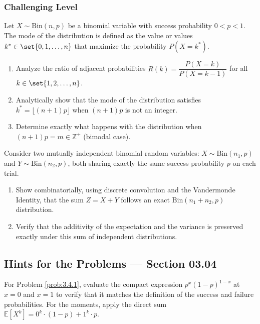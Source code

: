 \subsubsection*{Challenging Level}

\begin{problema}
	\label{prob:3.4.9}
	Let $X \sim \text{Bin}(n, p)$ be a binomial variable with success probability $0 < p < 1$. The mode of the distribution is defined as the value or values $k^* \in \set{0, 1, \dots, n}$ that maximize the probability $P(X = k^*)$.
	\begin{enumerate}
		\item Analyze the ratio of adjacent probabilities $R(k) = \dfrac{P(X = k)}{P(X = k-1)}$ for all $k \in \set{1, 2, \dots, n}$.
		\item Analytically show that the mode of the distribution satisfies $k^* = \lfloor (n+1)p \rfloor$ when $(n+1)p$ is not an integer.
		\item Determine exactly what happens with the distribution when $(n+1)p = m \in \mathbb{Z}^+$ (bimodal case).
	\end{enumerate}
\end{problema}

\begin{problema}
	\label{prob:3.4.10}
	Consider two mutually independent binomial random variables: $X \sim \text{Bin}(n_1, p)$ and $Y \sim \text{Bin}(n_2, p)$, both sharing exactly the same success probability $p$ on each trial.
	\begin{enumerate}
		\item Show combinatorially, using discrete convolution and the Vandermonde Identity, that the sum $Z = X + Y$ follows an exact $\text{Bin}(n_1 + n_2, p)$ distribution.
		\item Verify that the additivity of the expectation and the variance is preserved exactly under this sum of independent distributions.
	\end{enumerate}
\end{problema}

\subsection*{Hints for the Problems --- Section 03.04}

\begin{sugerencia}
	\label{sug:3.4.1}
	For Problem \ref{prob:3.4.1}, evaluate the compact expression $p^x(1-p)^{1-x}$ at $x=0$ and $x=1$ to verify that it matches the definition of the success and failure probabilities. For the moments, apply the direct sum $\mathbb{E}[X^k] = 0^k \cdot (1-p) + 1^k \cdot p$.
\end{sugerencia}

